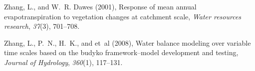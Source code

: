 \documentclass[draft,wrr]{AGUTeX}
\begin{document}
\begin{article}
\begin{thebibliography}{59}
Zhang, L., and W.~R. Dawes (2001), Response of mean annual evapotranspiration
  to vegetation changes at catchment scale, \textit{Water resources research},
  \textit{37}(3), 701--708.

Zhang, L., P.~N., H.~K., and et~al (2008), Water balance modeling over variable
  time scales based on the budyko framework--model development and testing,
  \textit{Journal of Hydrology}, \textit{360}(1), 117--131.

\end{thebibliography}


\end{article}
\end{document}
